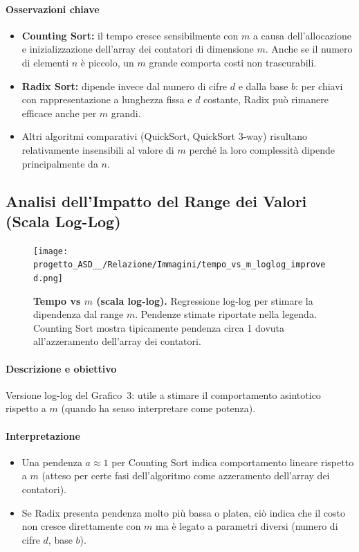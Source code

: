 \documentclass[a4paper, 11pt]{article}
\begin{document}
\paragraph{Osservazioni chiave}
\begin{itemize}
  \item \textbf{Counting Sort:} il tempo cresce sensibilmente con \(m\) a causa dell'allocazione e inizializzazione dell'array dei contatori di dimensione \(m\). Anche se il numero di elementi \(n\) è piccolo, un \(m\) grande comporta costi non trascurabili.
  \item \textbf{Radix Sort:} dipende invece dal numero di cifre \(d\) e dalla base \(b\): per chiavi con rappresentazione a lunghezza fissa e \(d\) costante, Radix può rimanere efficace anche per \(m\) grandi.
  \item Altri algoritmi comparativi (QuickSort, QuickSort 3-way) risultano relativamente insensibili al valore di \(m\) perché la loro complessità dipende principalmente da \(n\).
\end{itemize}

\subsection{Analisi dell'Impatto del Range dei Valori (Scala Log-Log)}
\begin{figure}[H]
\centering
\texttt{[image: progetto\_ASD\_\_/Relazione/Immagini/tempo\_vs\_m\_loglog\_improved.png]}
\caption{\textbf{Tempo vs \(m\) (scala log-log).} Regressione log-log per stimare la dipendenza dal range \(m\). Pendenze stimate riportate nella legenda. Counting Sort mostra tipicamente pendenza circa 1 dovuta all'azzeramento dell'array dei contatori.}
\label{fig:variazione_m}
\end{figure}

\paragraph{Descrizione e obiettivo}
Versione log-log del Grafico~3: utile a stimare il comportamento asintotico rispetto a \(m\) (quando ha senso interpretare come potenza).

\paragraph{Interpretazione}
\begin{itemize}
  \item Una pendenza \(a\approx 1\) per Counting Sort indica comportamento lineare rispetto a \(m\) (atteso per certe fasi dell'algoritmo come azzeramento dell'array dei contatori).
  \item Se Radix presenta pendenza molto più bassa o platea, ciò indica che il costo non cresce direttamente con \(m\) ma è legato a parametri diversi (numero di cifre \(d\), base \(b\)).
\end{itemize}
\end{document}
